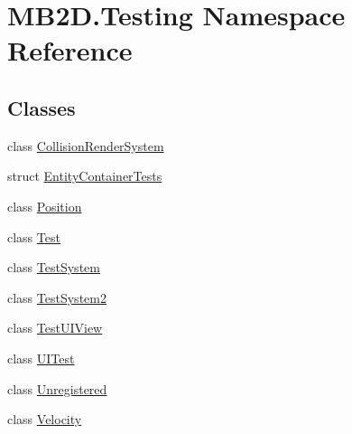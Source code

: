 \hypertarget{namespace_m_b2_d_1_1_testing}{}\section{M\+B2\+D.\+Testing Namespace Reference}
\label{namespace_m_b2_d_1_1_testing}
\subsection*{Classes}
\begin{DoxyCompactItemize}
\item 
class \hyperlink{class_m_b2_d_1_1_testing_1_1_collision_render_system}{Collision\+Render\+System}
\item 
struct \hyperlink{struct_m_b2_d_1_1_testing_1_1_entity_container_tests}{Entity\+Container\+Tests}
\item 
class \hyperlink{class_m_b2_d_1_1_testing_1_1_position}{Position}
\item 
class \hyperlink{class_m_b2_d_1_1_testing_1_1_test}{Test}
\item 
class \hyperlink{class_m_b2_d_1_1_testing_1_1_test_system}{Test\+System}
\item 
class \hyperlink{class_m_b2_d_1_1_testing_1_1_test_system2}{Test\+System2}
\item 
class \hyperlink{class_m_b2_d_1_1_testing_1_1_test_u_i_view}{Test\+U\+I\+View}
\item 
class \hyperlink{class_m_b2_d_1_1_testing_1_1_u_i_test}{U\+I\+Test}
\item 
class \hyperlink{class_m_b2_d_1_1_testing_1_1_unregistered}{Unregistered}
\item 
class \hyperlink{class_m_b2_d_1_1_testing_1_1_velocity}{Velocity}
\end{DoxyCompactItemize}
